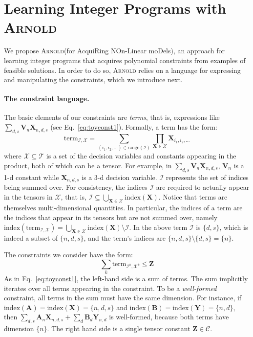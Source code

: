 \documentclass{article}
\newcommand{\learner}{\textsc{Arnold}\xspace}
\newcommand{\acronym}{AcquiRing NOn-Linear moDels}
\newcommand{\tensors}{\ensuremath{\mathcal{T}}\xspace}
\newcommand{\constants}{\ensuremath{\mathcal{C}}\xspace}
\newcommand{\indices}{\ensuremath{\mathcal{I}}\xspace}
\newcommand{\factors}{\ensuremath{\mathcal{X}}\xspace}
\newcommand{\TERM}[2]{\ensuremath{\mathrm{term}_{#1,#2}}\xspace}
\newcommand{\IDX}[1]{\ensuremath{\mathrm{index}\left(#1\right)}\xspace}
\newcommand{\RAN}[1]{\ensuremath{\mathrm{range}\left(#1\right)}\xspace}
\renewcommand\[{\begin{equation}}
\renewcommand\]{\end{equation}}
\newcommand{\TA}{\textbf{A}\xspace}
\newcommand{\TB}{\textbf{B}\xspace}
\newcommand{\TV}{\textbf{V}\xspace}
\newcommand{\TX}{\textbf{X}\xspace}
\newcommand{\TY}{\textbf{Y}\xspace}
\newcommand{\TZ}{\textbf{Z}\xspace}
\begin{document}
\section{Learning Integer Programs with \learner}
\label{sec:method}

We propose \learner (for \acronym), an approach for learning integer programs
that acquires polynomial constraints from examples of feasible solutions.  In
order to do so, \learner relies on a language for expressing and manipulating
the constraints, which we introduce next.

\paragraph{The constraint language.}  The basic elements of our constraints are
\emph{terms}, that is, expressions like $\sum_{d,s} \TV_n \TX_{n,d,s}$ (see
Eq.~\ref{eq:toyconst1}).  Formally, a term has the form:
%
\[
    \textstyle
    \TERM{\indices}{\factors} = \sum_{(i_1, i_2, \ldots) \in \RAN{\indices}} \prod_{\TX \in \factors} \TX_{i_1, i_2, \ldots}
    \label{eq:term}
\]
%
where $\factors \subseteq \tensors$ is a set of the decision
variables and constants appearing in the product, both of which can be a tensor. For example, in $\sum_{d,s} \TV_n \TX_{n,d,s}$, $\TV_n$ is a 1-d constant while $\TX_{n,d,s}$ is a 3-d decision variable. $\indices$ represents the set of
indices being summed over.
%
For consistency, the indices $\indices$ are required to actually appear in
the tensors in $\factors$, that is,
$\indices \subseteq \bigcup_{\TX \in \factors} \IDX{\TX}$.
%
Notice that terms are themselves multi-dimensional quantities.  In particular,
the indices of a term are the indices that appear in its tensors but are not
summed over, namely
$\IDX{\TERM{\indices}{\factors}} = \bigcup_{\TX \in \factors} \IDX{\TX} \setminus \indices$.
In the above term $\indices$ is $\{d, s\}$, which is indeed a subset of
$\{n, d, s\}$, and the term's indices are $\{n,d,s\} \setminus \{d,s\} =
\{n\}$.

The constraints we consider have the form:
%
\[
    \textstyle
    \sum_k \TERM{\indices^k}{\factors^k} \le \TZ
    \label{eq:constraint}
\]
%
As in Eq.~\ref{eq:toyconst1}, the left-hand side is a sum of
terms.  The sum implicitly iterates over all terms appearing in the constraint.
To be a \emph{well-formed} constraint, all terms in
the sum must have the same dimension.  For instance, if $\IDX{\TA} =
\IDX{\TX} = \{n,d,s\}$ and $\IDX{\TB} = \IDX{\TY} = \{n,d\}$, then $\sum_{d,s}
\TA_n \TX_{n,d,s} + \sum_d \TB_d \TY_{n,d}$ is well-formed, because
both terms have dimension $\{n\}$.  The right hand side is a single tensor
constant $\TZ \in \constants$.
\end{document}
